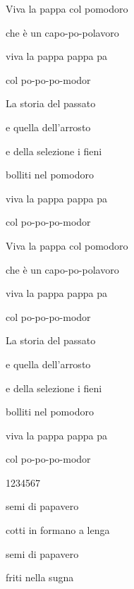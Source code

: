 \documentclass{article}
\begin{document}
Viva la pappa col pomodoro

che \`e un capo-po-polavoro

viva la pappa pappa pa

col po-po-po-modor

La storia del passato

e quella dell'arrosto

e della selezione i fieni

bolliti nel pomodoro

viva la pappa pappa pa

col po-po-po-modor

Viva la pappa col pomodoro

che \`e un capo-po-polavoro

viva la pappa pappa pa

col po-po-po-modor

La storia del passato

e quella dell'arrosto

e della selezione i fieni

bolliti nel pomodoro

viva la pappa pappa pa

col po-po-po-modor

1234567

semi di papavero

cotti in formano a lenga

semi di papavero

friti nella sugna
\end{document}
